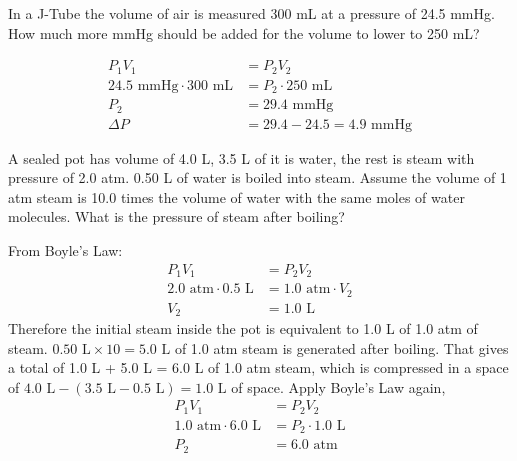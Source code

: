 \documentclass{article}
\begin{document}
\begin{custom-big}[Example 9]
In a J-Tube the volume of air is measured 300 mL at a pressure of 24.5 mmHg. How much more mmHg should be added for the volume to lower to 250 mL?
\end{custom-big}
\begin{solution}
\begin{align*}
    P_1V_1&=P_2V_2\\
    24.5\text{ mmHg}\cdot 300\text{ mL}&=P_2\cdot 250\text{ mL}\\
    P_2&=29.4\text{ mmHg}\\
    \Delta P&=29.4-24.5=4.9\text{ mmHg}
\end{align*}
\end{solution}


\begin{custom-big}[Example 10]
A sealed pot has volume of 4.0 L, 3.5 L of it is water, the rest is steam with pressure of 2.0 atm. 0.50 L of water is boiled into steam. Assume the volume of 1 atm steam is 10.0 times the volume of water with the same moles of water molecules. What is the pressure of steam after boiling?
\end{custom-big}
\begin{solution}
From Boyle's Law:
\begin{align*}
    P_1V_1&=P_2V_2\\
    2.0\text{ atm}\cdot 0.5\text{ L}&=1.0\text{ atm}\cdot V_2\\
    V_2&=1.0\text{ L}
\end{align*}
Therefore the initial steam inside the pot is equivalent to 1.0 L of 1.0 atm of steam. $0.50\text{ L}\times 10=5.0\text{ L}$ of 1.0 atm steam is generated after boiling. That gives a total of 1.0 L + 5.0 L = 6.0 L of 1.0 atm steam, which is compressed in a space of $4.0\text{ L}-(3.5\text{ L}-0.5\text{ L})=1.0\text{ L}$ of space. Apply Boyle's Law again,
\begin{align*}
    P_1V_1&=P_2V_2\\
    1.0\text{ atm}\cdot 6.0\text{ L}&=P_2\cdot 1.0\text{ L}\\
    P_2&=6.0\text{ atm}
\end{align*}
\end{solution}
\end{document}
